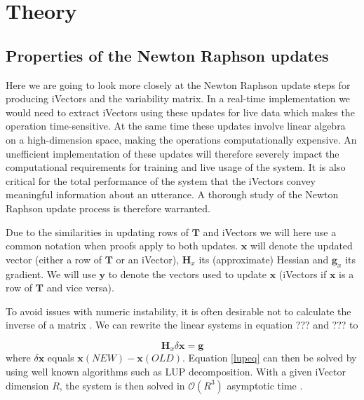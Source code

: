 \chapter{Theory}
\label{sect:Theory}

\section{Properties of the Newton Raphson updates}

Here we are going to look more closely at the Newton Raphson update steps for producing iVectors and the variability matrix. In a real-time implementation we would need to extract iVectors using these updates for live data which makes the operation time-sensitive. At the same time these updates involve linear algebra on a high-dimension space, making the operations computationally expensive. An unefficient implementation of these updates will therefore severely impact the computational requirements for training and live usage of the system. It is also critical for the total performance of the system that the iVectors convey meaningful information about an utterance. A thorough study of the Newton Raphson update process is therefore warranted. 

Due to the similarities in updating rows of $\mathbf{T}$ and iVectors we will here use a common notation when proofs apply to both updates. $\mathbf{x}$ will denote the updated vector (either a row of $\mathbf{T}$ or an iVector), $\mathbf{H}_x$ its (approximate) Hessian and $\mathbf{g}_x$ its gradient. We will use $\mathbf{y}$ to denote the vectors used to update $\mathbf{x}$ (iVectors if $\mathbf{x}$ is a row of $\mathbf{T}$ and vice versa).

To avoid issues with numeric instability, it is often desirable not to calculate the inverse of a matrix \cite[p. 743]{cormen}. We can rewrite the linear systems in equation ??? and ??? to

\begin{equation}\label{lupeq}
\mathbf{H}_x\delta\mathbf{x} = \mathbf{g}
\end{equation}
where $\delta\mathbf{x}$ equals $\mathbf{x}(NEW)-\mathbf{x}(OLD)$. Equation \ref{lupeq} can then be solved by using well known algorithms such as LUP decomposition. With a given iVector dimension $R$, the system is then solved in $\mathcal{O}(R^3)$ asymptotic time \cite[p. 754]{cormen}. 

